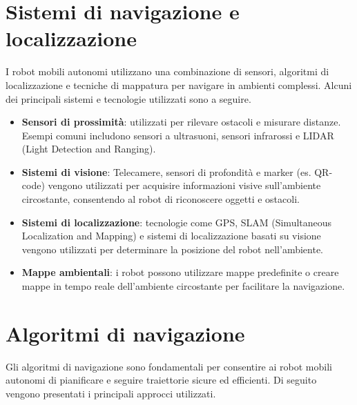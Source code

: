 \section{Sistemi di navigazione e localizzazione}
I robot mobili autonomi utilizzano una combinazione di sensori, algoritmi di localizzazione e tecniche di mappatura per navigare in ambienti complessi. Alcuni dei principali sistemi e tecnologie utilizzati sono a seguire.
\begin{itemize}
    \item \textbf{Sensori di prossimità}: utilizzati per rilevare ostacoli e misurare distanze. Esempi comuni includono sensori a ultrasuoni, sensori infrarossi e LIDAR (Light Detection and Ranging).
    \item \textbf{Sistemi di visione}: Telecamere, sensori di profondità e marker (es. QR-code) vengono utilizzati per acquisire informazioni visive sull'ambiente circostante, consentendo al robot di riconoscere oggetti e ostacoli.
    \item \textbf{Sistemi di localizzazione}: tecnologie come GPS, SLAM (Simultaneous Localization and Mapping) e sistemi di localizzazione basati su visione vengono utilizzati per determinare la posizione del robot nell'ambiente.
    \item \textbf{Mappe ambientali}: i robot possono utilizzare mappe predefinite o creare mappe in tempo reale dell'ambiente circostante per facilitare la navigazione.
\end{itemize}

\section{Algoritmi di navigazione}
Gli algoritmi di navigazione sono fondamentali per consentire ai robot mobili autonomi di pianificare e seguire traiettorie sicure ed efficienti. Di seguito vengono presentati i principali approcci utilizzati.

